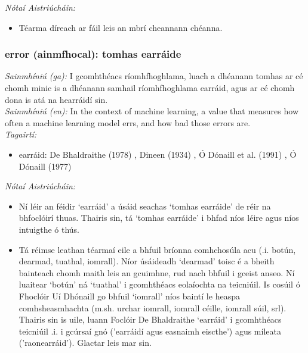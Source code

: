  \noindent \textit{Nótaí Aistriúcháin:}
\begin{itemize}
	\item Téarma díreach ar fáil leis an mbrí cheannann chéanna.
\end{itemize}


\subsubsection*{error (ainmfhocal): tomhas earráide}
 \noindent \textit{Sainmhíniú (ga):} I gcomhthéacs ríomhfhoghlama, luach a dhéanann tomhas ar cé chomh minic is a dhéanann samhail ríomhfhoghlama earráid, agus ar cé chomh dona is atá na hearráidí sin.
\\
 \noindent \textit{Sainmhíniú (en):} In the context of machine learning, a value that measures how often a machine learning model errs, and how bad those errors are.
\\
 \noindent \textit{Tagairtí:}
\begin{itemize}
	\item earráid: De Bhaldraithe (1978) \cite{de-bhaldraithe}, Dineen (1934) \cite{dineen}, Ó Dónaill et al. (1991) \cite{focloir-beag}, Ó Dónaill (1977) \cite{odonaill}
\end{itemize}

 \noindent \textit{Nótaí Aistriúcháin:}
\begin{itemize}
	\item Ní léir an féidir `earráid' a úsáid seachas `tomhas earráide' de réir na bhfoclóirí thuas. Thairis sin, tá `tomhas earráide' i bhfad níos léire agus níos intuigthe ó thús.
	\item Tá réimse leathan téarmaí eile a bhfuil bríonna comhchosúla acu (.i. botún, dearmad, tuathal, iomrall). Níor úsáideadh `dearmad' toisc é a bheith bainteach chomh maith leis an gcuimhne, rud nach bhfuil i gceist anseo. Ní luaitear `botún' ná `tuathal' i gcomhthéacs eolaíochta na teicniúil. Is cosúil ó Fhoclóir Uí Dhónaill go bhfuil `iomrall' níos baintí le  heaspa comhsheasmhachta (m.sh. urchar iomrall, iomrall céille, iomrall súil, srl). Thairis sin is uile, luann Foclóir De Bhaldraithe `earráid' i gcomhthéacs teicniúil .i. i gcúrsaí gnó ('earráidí agus easnaimh eiscthe') agus míleata ('raonearráid'). Glactar leis mar sin.
\end{itemize}


